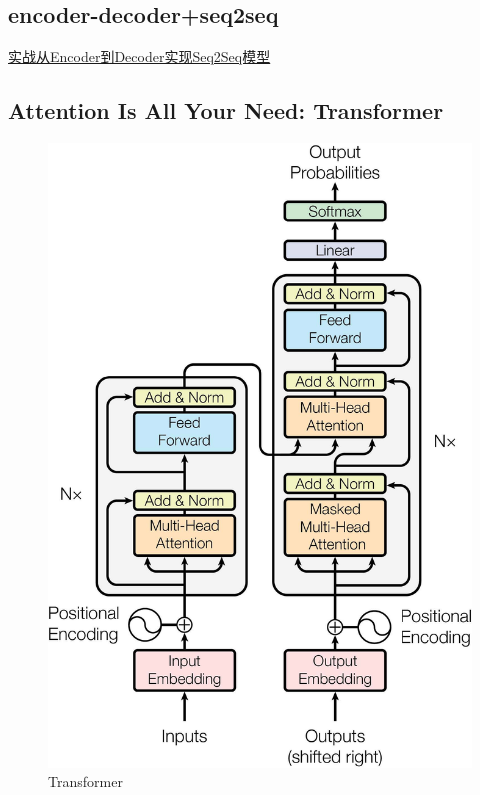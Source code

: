 \documentclass[UTF8]{article}%
\begin{document}
		\subsection{encoder-decoder+seq2seq}
			\href{https://zhuanlan.zhihu.com/p/27608348}{实战从Encoder到Decoder实现Seq2Seq模型}
		\newpage
		\subsection{Attention Is All Your Need: Transformer}
		    \begin{figure}[h]%
				\centering  %
				\includegraphics[width=0.5\linewidth]{figures/Transformer}  %
				\caption{Transformer}  %
				\label{Transformer}   %
			\end{figure}
\end{document}
